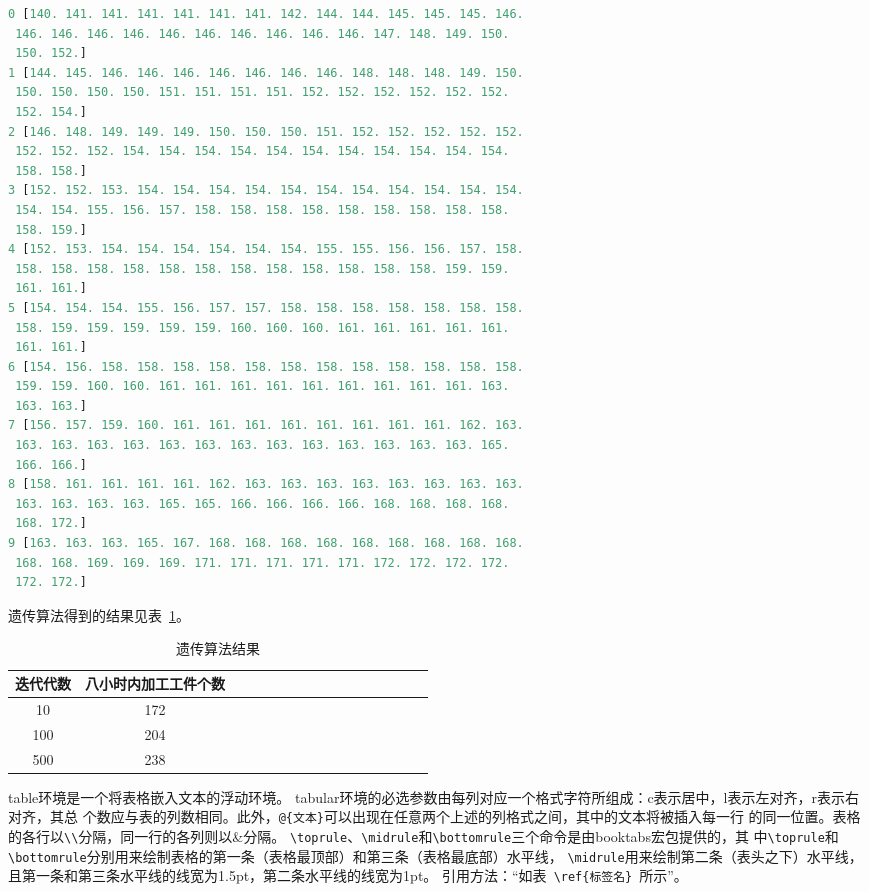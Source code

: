 \documentclass{cumcmthesis}
\begin{document}
	\begin{lstlisting}[language=python]
0 [140. 141. 141. 141. 141. 141. 141. 142. 144. 144. 145. 145. 145. 146.
 146. 146. 146. 146. 146. 146. 146. 146. 146. 146. 147. 148. 149. 150.
 150. 152.]
1 [144. 145. 146. 146. 146. 146. 146. 146. 146. 148. 148. 148. 149. 150.
 150. 150. 150. 150. 151. 151. 151. 151. 152. 152. 152. 152. 152. 152.
 152. 154.]
2 [146. 148. 149. 149. 149. 150. 150. 150. 151. 152. 152. 152. 152. 152.
 152. 152. 152. 154. 154. 154. 154. 154. 154. 154. 154. 154. 154. 154.
 158. 158.]
3 [152. 152. 153. 154. 154. 154. 154. 154. 154. 154. 154. 154. 154. 154.
 154. 154. 155. 156. 157. 158. 158. 158. 158. 158. 158. 158. 158. 158.
 158. 159.]
4 [152. 153. 154. 154. 154. 154. 154. 154. 155. 155. 156. 156. 157. 158.
 158. 158. 158. 158. 158. 158. 158. 158. 158. 158. 158. 158. 159. 159.
 161. 161.]
5 [154. 154. 154. 155. 156. 157. 157. 158. 158. 158. 158. 158. 158. 158.
 158. 159. 159. 159. 159. 159. 160. 160. 160. 161. 161. 161. 161. 161.
 161. 161.]
6 [154. 156. 158. 158. 158. 158. 158. 158. 158. 158. 158. 158. 158. 158.
 159. 159. 160. 160. 161. 161. 161. 161. 161. 161. 161. 161. 161. 163.
 163. 163.]
7 [156. 157. 159. 160. 161. 161. 161. 161. 161. 161. 161. 161. 162. 163.
 163. 163. 163. 163. 163. 163. 163. 163. 163. 163. 163. 163. 163. 165.
 166. 166.]
8 [158. 161. 161. 161. 161. 162. 163. 163. 163. 163. 163. 163. 163. 163.
 163. 163. 163. 163. 165. 165. 166. 166. 166. 166. 168. 168. 168. 168.
 168. 172.]
9 [163. 163. 163. 165. 167. 168. 168. 168. 168. 168. 168. 168. 168. 168.
 168. 168. 169. 169. 169. 171. 171. 171. 171. 171. 172. 172. 172. 172.
 172. 172.]
	\end{lstlisting}

	遗传算法得到的结果见表~\ref{table:ga_results}。

	\begin{table}[!htbp]
		\centering
		\caption{遗传算法结果}
		\label{table:ga_results}
		\begin{tabular}{cccccccccccccccc}
	\toprule[1.5pt]
			迭代代数 & 八小时内加工工件个数 \\
	\midrule[1pt]
			10 & 172 \\
			100 & 204 \\
			500 & 238 \\
	\bottomrule[1.5pt]
	\end{tabular}
	\end{table}
	
	\bigskip
	table环境是一个将表格嵌入文本的浮动环境。
	tabular环境的必选参数由每列对应一个格式字符所组成：c表示居中，l表示左对齐，r表示右对齐，其总
	个数应与表的列数相同。此外，\verb|@{文本}|可以出现在任意两个上述的列格式之间，其中的文本将被插入每一行
	的同一位置。表格的各行以\verb|\\|分隔，同一行的各列则以\&分隔。
	\verb|\toprule|、\verb|\midrule|和\verb|\bottomrule|三个命令是由booktabs宏包提供的，其
	中\verb|\toprule|和\verb|\bottomrule|分别用来绘制表格的第一条（表格最顶部）和第三条（表格最底部）水平线，
	\verb|\midrule|用来绘制第二条（表头之下）水平线，且第一条和第三条水平线的线宽为1.5pt，第二条水平线的线宽为1pt。
	引用方法：“如表~\verb|\ref{标签名}|~所示”。
	
\end{document}
